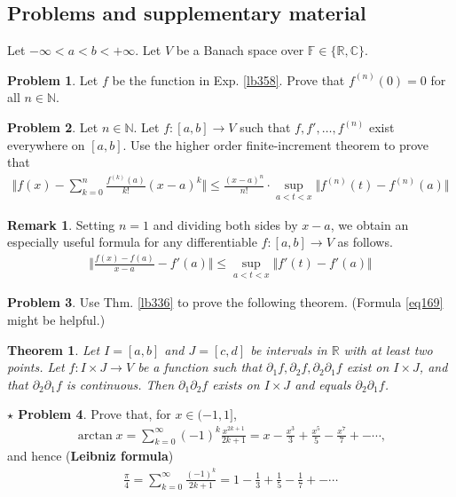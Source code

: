 \documentclass[12pt,b5paper,notitlepage]{article}
\theoremstyle{definition}
\newtheorem{rem}[df]{Remark}
\newtheorem{prob}{\color{red}Problem}[section]
\newtheorem{sprob}[prob]{\color{red}$\star$ Problem}
\theoremstyle{plain}
\newtheorem{thm}[df]{Theorem}
\newcommand{\Cbb}{\mathbb C}
\newcommand{\Nbb}{\mathbb N}
\newcommand{\Rbb}{\mathbb R}
\newcommand{\Fbb}{\mathbb F}
\numberwithin{equation}{section}
\begin{document}
\subsection{Problems and supplementary material}


Let $-\infty<a<b<+\infty$. Let $V$ be a Banach space over $\Fbb\in\{\Rbb,\Cbb\}$.


\begin{prob}
Let $f$ be the function in Exp. \ref{lb358}. Prove that $f^{(n)}(0)=0$ for all $n\in\Nbb$.
\end{prob}




\begin{prob}\label{lb361}
Let $n\in\Nbb$. Let $f:[a,b]\rightarrow V$ such that $f,f',\dots,f^{(n)}$ exist everywhere on $[a,b]$. Use the higher order finite-increment theorem to prove that
\begin{align}
\Big\Vert f(x)-\sum_{k=0}^n\frac{f^{(k)}(a)}{k!}(x-a)^k\Big\Vert\leq \frac{(x-a)^{n}}{n!}\cdot \sup_{a<t<x}\Vert f^{(n)}(t)-f^{(n)}(a)\Vert  \label{eq174}
\end{align}
\end{prob}

\begin{rem}\label{lb404}
Setting $n=1$ and dividing both sides by $x-a$, we obtain an especially useful formula for any differentiable $f:[a,b]\rightarrow V$ as follows.
\begin{align}
\Big\Vert \frac{f(x)-f(a)}{x-a}-f'(a)\Big\Vert\leq \sup_{a<t<x}
\big\Vert f'(t)-f'(a)\big\Vert  \label{eq169}
\end{align}
\end{rem}


\begin{prob}
Use Thm. \ref{lb336} to prove the following theorem. (Formula \eqref{eq169} might be helpful.)
\end{prob}



\begin{thm}\label{lb406}
Let $I=[a,b]$ and $J=[c,d]$ be intervals in $\Rbb$ with at least two points. Let $f:I\times J\rightarrow V$ be a function such that $\partial_1f,\partial_2f,\partial_2\partial_1f$ exist on $I\times J$, and that $\partial_2\partial_1f$ is continuous. Then $\partial_1\partial_2f$ exists on $I\times J$ and equals $\partial_2\partial_1f$.
\end{thm}




\begin{sprob}
Prove that, for $x \in(-1,1]$,
\begin{align}\label{eq198}
\arctan x=\sum_{k=0}^{\infty}(-1)^k \frac{x^{2 k+1}}{2 k+1}=x-\frac{x^3}{3}+\frac{x^5}{5}-\frac{x^7}{7}+-\cdots,
\end{align}
and hence (\textbf{Leibniz formula})
\begin{align*}
\frac{\pi}{4}=\sum_{k=0}^{\infty} \frac{(-1)^k}{2 k+1}=1-\frac{1}{3}+\frac{1}{5}-\frac{1}{7}+-\cdots
\end{align*}
\end{sprob}
\end{document}
